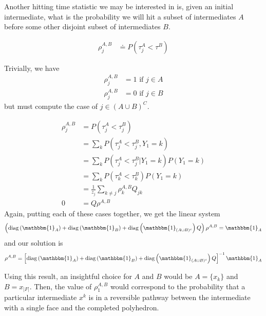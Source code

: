Another hitting time statistic we may be interested in is, given an initial intermediate, what is the probability we will hit a subset of intermediates $A$ before some other disjoint subset of intermediates $B$. 

\begin{align}
\rho^{A,B}_j &\doteq P(\tau^A_j < \tau^B)
\end{align}

Trivially, we have 
\begin{align}
\rho^{A,B}_j &= 1 \text{ if } j\in A \\ 
\rho^{A,B}_j &= 0 \text{ if } j\in B 
\end{align}
but must compute the case of $j \in (A\cup B)^C$.

\begin{align}
\rho^{A,B}_j &= P(\tau^A_j < \tau^B_j) \\
&= \sum_{k}P(\tau^A_j < \tau^B_j, Y_1 = k) \\
&= \sum_{k}P(\tau^A_j < \tau^B_j|Y_1 = k)P(Y_1 = k) \\
&= \sum_{k}P(\tau^A_k < \tau^B_k)P(Y_1 = k) \\
&= \frac{1}{z_j}\sum_{k \neq j} \rho^{A,B}_kQ_{jk} \\
0 &= Q\rho^{A,B}
\end{align}
Again, putting each of these cases together, we get the linear system
\begin{align}
\left(\diag\left(\mathbbm{1}_A\right) + \diag\left(\mathbbm{1}_B\right) + \diag\left(\mathbbm{1}_{(A\cup B)^c}\right)Q\right)\rho^{A,B} =\mathbbm{1}_{A}
\end{align}
and our solution is
\begin{align}
\rho^{A,B} = \left[\diag\left(\mathbbm{1}_A\right) + \diag\left(\mathbbm{1}_B\right) + \diag\left(\mathbbm{1}_{(A\cup B)^c}\right)Q\right]^{-1}\mathbbm{1}_{A}
\end{align}

Using this result, an insightful choice for $A$ and $B$ would be $A = \{x_k\}$ and $B = x_{|F|}$. Then, the value of $\rho_1^{A,B}$ would correspond to the probability that a particular intermediate $x^k$ is in a reversible pathway between the intermediate with a single face and the completed polyhedron. 
